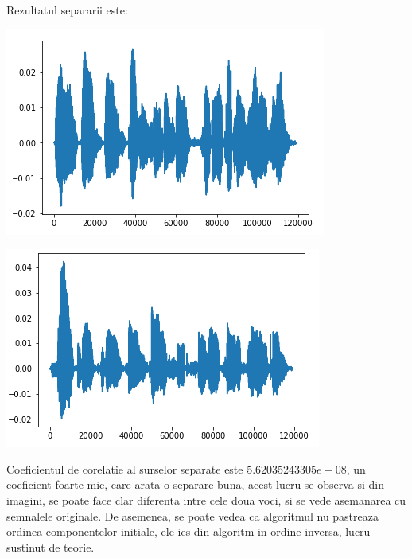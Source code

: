 \documentclass[12pt,oneside]{article}
\begin{document}
Rezultatul separarii este:
\begin{center}
	\includegraphics[scale=1]{speech_separated_1}
 \end{center}
\begin{center}
	\includegraphics[scale=1]{speech_separated_2}
 \end{center}

 Coeficientul de corelatie al surselor separate este $5.62035243305e-08$, un coeficient foarte mic, care arata o separare buna, acest lucru se observa si din imagini, se poate face clar diferenta intre cele doua voci, si se vede asemanarea cu semnalele originale. De asemenea, se poate vedea ca algoritmul nu pastreaza ordinea componentelor initiale, ele ies din algoritm in ordine inversa, lucru sustinut de teorie.
\end{document}
